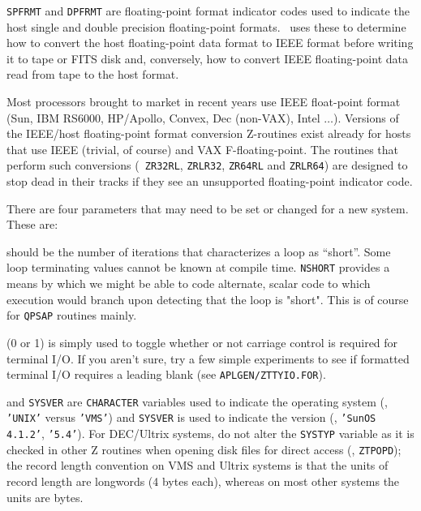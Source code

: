 {\tt SPFRMT} and {\tt DPFRMT} are floating-point format indicator codes
used to indicate the host single and double precision floating-point
formats.  \AIPS\ uses these to determine how to convert the host
floating-point data format to IEEE format before writing it to tape or
FITS disk and, conversely, how to convert IEEE floating-point data read
from tape to the host format.

Most processors brought to market in recent years use IEEE float-point
format (Sun, IBM RS6000, HP/Apollo, Convex, Dec (non-VAX), Intel $\dots$).
Versions of the IEEE/host floating-point format conversion Z-routines
exist already for hosts that use IEEE (trivial, of course) and VAX
F-floating-point.  The routines that perform such conversions ({\tt
ZR32RL}, {\tt ZRLR32}, {\tt ZR64RL} and {\tt ZRLR64}) are designed to
stop dead in their tracks if they see an unsupported floating-point
indicator code.
\medskip


There are four parameters that may need to be set or changed for a
new system.  These are:\medskip

\item{} should be the number of iterations that
characterizes a loop as ``short''.  Some loop terminating values
cannot be known at compile time.  {\tt NSHORT} provides a means by
which we might be able to code alternate, scalar code to which
execution would branch upon detecting that the loop is "short".  This
is of course for {\tt \dol QPSAP} routines mainly.

\item{} (0 or 1) is simply used to toggle
whether or not carriage control is required for terminal I/O.  If you
aren't sure, try a few simple experiments to see if formatted terminal
I/O requires a leading blank (see {\tt \dol APLGEN/ZTTYIO.FOR}).

\item{} and {\tt SYSVER} are {\tt CHARACTER}
variables used to indicate the operating system (\eg, {\tt 'UNIX'}
versus {\tt 'VMS'}) and {\tt SYSVER} is used to indicate the version
(\eg, {\tt 'SunOS 4.1.2'}, {\tt '5.4'}).  For DEC/Ultrix systems, do not
alter the {\tt SYSTYP} variable as it is checked in other Z routines
when opening disk files for direct access (\eg, {\tt ZTPOPD}); the
record length convention on VMS and Ultrix systems is that the units of
record length are longwords (4 bytes each), whereas on most other
systems the units are bytes.
\medskip

